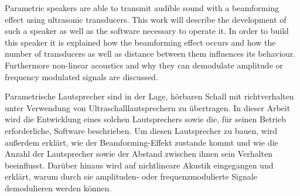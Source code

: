 %

\emptydoublepage \thispagestyle{empty} \vspace*{1cm}

{\hfill\fontfamily{\sfdefault}\bfseries\fontsize{22}{22}\selectfont{Abstract}} \vspace*{1cm}

\noindent
Parametric speakers are able to transmit audible sound with a beamforming effect using ultrasonic transducers. This work will describe the development of such a speaker as well as the software necessary to operate it.\p
In order to build this speaker it is explained how the beamforming effect occurs and how the number of transducers as well as distance between them influences its behaviour. Furthermore non-linear acoustics and why they can demodulate amplitude or frequency modulated signals are discussed.

\emptydoublepage \thispagestyle{empty} \vspace*{1cm}

{\hfill\fontfamily{\sfdefault}\bfseries\fontsize{22}{22}\selectfont{Kurzbeschreibung}} \vspace*{1cm}

\noindent
Parametrische Lautsprecher sind in der Lage, hörbaren Schall mit richtverhalten unter Verwendung von Ultraschalllautsprechern zu übertragen. In dieser Arbeit wird die Entwicklung eines solchen Lautsprechers sowie die, für seinen Betrieb erforderliche, Software beschrieben.\p
Um diesen Lautsprecher zu bauen, wird außerdem erklärt, wie der Beamforming-Effekt zustande kommt und wie die Anzahl der Lautsprecher sowie der Abstand zwischen ihnen sein Verhalten beeinflusst. Darüber hinaus wird auf nichtlineare Akustik eingegangen und erklärt, warum durch sie amplituden- oder frequenzmodulierte Signale demodulieren werden können.
